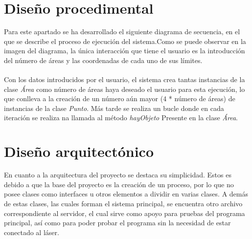 \section{Diseño procedimental}

Para este apartado se ha desarrollado el siguiente diagrama de secuencia, en el que se describe el proceso de ejecución del sistema.Como se puede observar en la imagen del diagrama, la única interacción que tiene el usuario es la introducción del número de áreas y las coordenadas de cada uno de sus límites.\\
\\
Con los datos introducidos por el usuario, el sistema crea tantas instancias de la clase \textit{Área} como número de áreas haya deseado el usuario para esta ejecución, lo que conlleva a la creación de un número aún mayor (4 * número de áreas) de instancias de la clase \textit{Punto}. Más tarde se realiza un bucle donde en cada iteración se realiza na llamada al método \textit{hayObjeto} Presente en la clase \textit{Área}.

\section{Diseño arquitectónico}

En cuanto a la arquitectura del proyecto se destaca su simplicidad. Estos es debido a que la base del proyecto es la creación de un proceso, por lo que no posee clases como interfaces u otros elementos a dividir en varias clases.
A demás de estas clases, las cuales forman el sistema principal, se encuentra otro archivo correspondiente al servidor, el cual sirve como apoyo para pruebas del programa principal, así como para poder probar el programa sin la necesidad de estar conectado al láser.